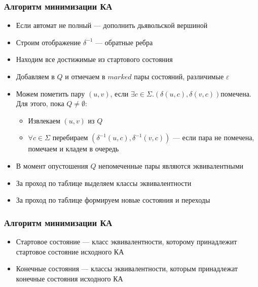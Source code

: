 \documentclass{beamer}
\begin{document}
\begin{frame}[fragile]
  \transwipe[direction=90]
  \frametitle{Алгоритм минимизации КА}   
    \begin{itemize}
      \item Если автомат не полный --- дополнить дьявольской вершиной
      \item Строим отображение $\delta^{-1}$ --- обратные ребра
      \item Находим все достижимые из стартового состояния
      \item Добавляем в $Q$ и отмечаем в $marked$ пары состояний, различимые $\varepsilon$
      \item Можем пометить пару $(u, v)$, если $\exists c \in \Sigma. (\delta(u, c), \delta(v, c)) помечена$. Для этого, пока $Q \neq \emptyset$:
      \begin{itemize}
        \item Извлекаем $(u, v)$ из $Q$
        \item $\forall c \in \Sigma$ перебираем $(\delta^{-1}(u, c), \delta^{-1}(v, c))$ --- если пара не помечена, помечаем и кладем в очередь
      \end{itemize}
      \item В момент опустошения $Q$ непомеченные пары являются эквивалентными
      \item За проход по таблице выделяем классы эквивалентности
      \item За проход по таблице формируем новые состояния и переходы	
    \end{itemize}
    
\end{frame}

\begin{frame}[fragile]
  \transwipe[direction=90]
  \frametitle{Алгоритм минимизации КА}   
    \begin{itemize}
      \item Стартовое состояние --- класс эквивалентности, которому принадлежит стартовое состояние исходного КА
      \item Конечные состояния --- классы эквивалентности, которым принадлежат конечные состояния исходного КА
    \end{itemize}
    
\end{frame}
\end{document}
